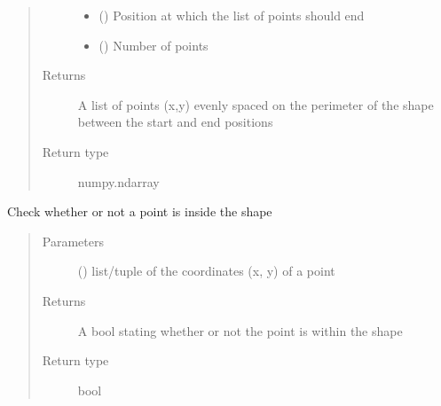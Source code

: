\documentclass[letterpaper,10pt,english]{sphinxmanual}
\begin{document}
\begin{fulllineitems}
\begin{fulllineitems}
\begin{quote}
\begin{description}
\begin{itemize}
\item {} 
 () \textendash{} Position at which the list of points should end

\item {} 
 () \textendash{} Number of points

\end{itemize}

\item[{Returns}] \leavevmode
A list of points (x,y) evenly spaced on the perimeter of the shape between the start and end positions

\item[{Return type}] \leavevmode
numpy.ndarray

\end{description}\end{quote}

\end{fulllineitems}


\begin{fulllineitems}
\label{\detokenize{source/pyzones:pyzones.Shape.is_point_inside}}
Check whether or not a point is inside the shape
\begin{quote}\begin{description}
\item[{Parameters}] \leavevmode
{} () \textendash{} list/tuple of the coordinates (x, y) of a point

\item[{Returns}] \leavevmode
A bool stating whether or not the point is within the shape

\item[{Return type}] \leavevmode
bool

\end{description}\end{quote}

\end{fulllineitems}


\end{fulllineitems}
\end{document}
